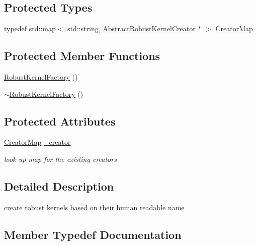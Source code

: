 \subsection*{Protected Types}
\begin{DoxyCompactItemize}
\item 
typedef std\+::map$<$ std\+::string, \mbox{\hyperlink{classg2o_1_1_abstract_robust_kernel_creator}{Abstract\+Robust\+Kernel\+Creator}} $\ast$ $>$ \mbox{\hyperlink{classg2o_1_1_robust_kernel_factory_aa143765542cbf4738e2137d61517b218}{Creator\+Map}}
\end{DoxyCompactItemize}
\subsection*{Protected Member Functions}
\begin{DoxyCompactItemize}
\item 
\mbox{\hyperlink{classg2o_1_1_robust_kernel_factory_af1df5179d6823881c9c3531640029eae}{Robust\+Kernel\+Factory}} ()
\item 
\mbox{\hyperlink{classg2o_1_1_robust_kernel_factory_a4b644b5cbf7f9bec42b8c168e8416011}{$\sim$\+Robust\+Kernel\+Factory}} ()
\end{DoxyCompactItemize}
\subsection*{Protected Attributes}
\begin{DoxyCompactItemize}
\item 
\mbox{\hyperlink{classg2o_1_1_robust_kernel_factory_aa143765542cbf4738e2137d61517b218}{Creator\+Map}} \mbox{\hyperlink{classg2o_1_1_robust_kernel_factory_af5f3cea409d3f18baa40da898d21424b}{\+\_\+creator}}
\begin{DoxyCompactList}\small\item\em look-\/up map for the existing creators \end{DoxyCompactList}\end{DoxyCompactItemize}


\subsection{Detailed Description}
create robust kernels based on their human readable name 

\subsection{Member Typedef Documentation}
\mbox{\label{classg2o_1_1_robust_kernel_factory_aa143765542cbf4738e2137d61517b218}} 
